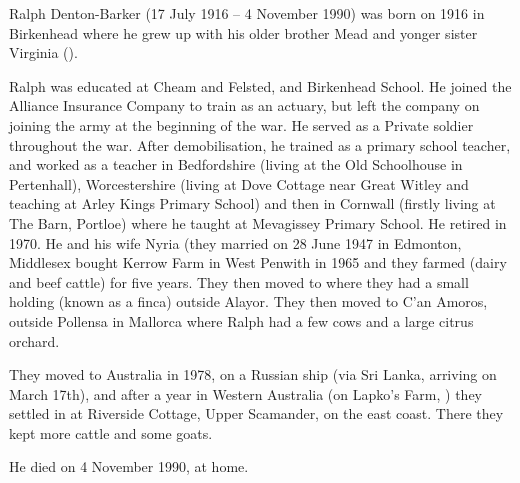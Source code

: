 
Ralph Denton-Barker (17 July 1916 -- 4 November 1990) was born on 1916 in Birkenhead \cite{BMDIndex_RalphMundayDentonBarker_birth} where he grew up with his older brother Mead and yonger sister Virginia ().

Ralph was educated at Cheam and Felsted, and Birkenhead School. He joined the Alliance Insurance Company to train as an actuary, but left the company on joining the army at the beginning of the war. He served as a Private soldier throughout the war. After demobilisation, he trained as a primary school teacher, and worked as a teacher in Bedfordshire (living at the Old Schoolhouse in Pertenhall), Worcestershire (living at Dove Cottage near Great Witley and teaching at Arley Kings Primary School) and then in Cornwall (firstly living at The Barn, Portloe) where he taught at Mevagissey Primary School.  He retired in 1970.  He and his wife Nyria (they married on 28 June 1947 in Edmonton, Middlesex \cite{MarriageCertRalphDentonBarkerJoanNyriaPowell} bought Kerrow Farm in West Penwith in 1965 and they farmed (dairy and beef cattle) for five years. They then moved to  where they had a small holding (known as a finca) outside Alayor. They then moved to C'an Amoros, outside Pollensa in Mallorca where Ralph had a few cows and a large citrus orchard.

They moved to Australia in 1978, on a Russian ship (via Sri Lanka, arriving on March 17th), and after a year in Western Australia (on Lapko's Farm, ) they settled in  at Riverside Cottage, Upper Scamander, on the east coast. There they kept more cattle and some goats.

He died on 4 November 1990, at home.

